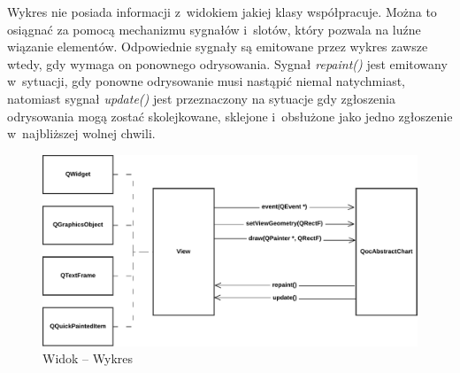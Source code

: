 Wykres nie posiada informacji z~widokiem jakiej klasy współpracuje. Można to osiągnać za pomocą mechanizmu sygnałów i~slotów, który pozwala na luźne wiązanie elementów. Odpowiednie sygnały są emitowane przez wykres zawsze wtedy, gdy wymaga on ponownego odrysowania.
Sygnał \textit{repaint()} jest emitowany w~sytuacji, gdy ponowne odrysowanie musi nastąpić niemal natychmiast, natomiast sygnał \textit{update()} jest przeznaczony na sytuacje gdy zgłoszenia odrysowania mogą zostać skolejkowane, sklejone i~obsłużone jako jedno zgłoszenie w~najbliższej wolnej chwili.


\begin{figure}[H]
\centering
\includegraphics[scale=0.75]{img/widok-wykres.pdf}
\caption{Widok -- Wykres}\label{rys:widok:wykres}
\end{figure}




